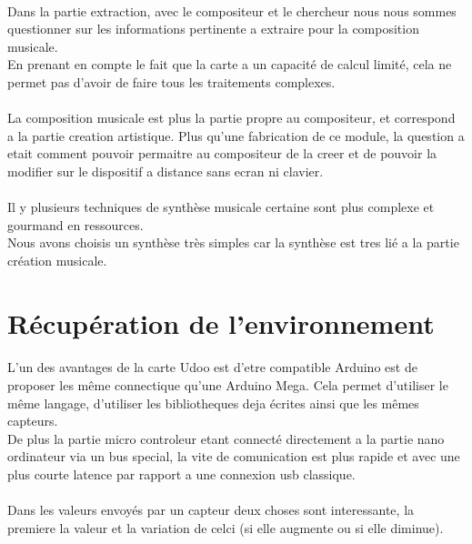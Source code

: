 \documentclass[a4paper, titlepage, oneside, 12pt]{article}%
\begin{document}
\paragraph{}
Dans la partie extraction, avec le compositeur et le chercheur nous nous sommes questionner sur les informations pertinente a extraire pour la composition musicale.\\ 
En prenant en compte le fait que la carte a un capacité de calcul limité, cela ne permet pas d'avoir de faire tous les traitements complexes.


\paragraph{}
La composition musicale est plus la partie propre au compositeur, et correspond a la partie creation artistique. Plus qu'une fabrication de ce module, la question a etait comment pouvoir permaitre au compositeur de la creer et de pouvoir la modifier sur le dispositif a distance sans ecran ni clavier.

\paragraph{}
Il y plusieurs techniques de synthèse musicale certaine sont plus complexe et gourmand en ressources.\\ Nous avons choisis un synthèse très simples car la synthèse est tres lié a la partie création musicale. 

\section{Récupération de l'environnement}
\paragraph{}
L'un des avantages de la carte Udoo est d'etre compatible Arduino est de proposer les même connectique qu'une Arduino Mega. Cela permet d'utiliser le même langage, d'utiliser les bibliotheques deja écrites ainsi que les mêmes capteurs.\\
De plus la partie  micro controleur etant connecté directement a la partie nano ordinateur via un bus special, la vite de comunication est plus rapide et avec une plus courte latence par rapport a une connexion usb classique.

\paragraph{}
Dans les valeurs envoyés par un capteur deux choses sont interessante, la premiere la valeur et la variation de celci (si elle augmente ou si elle diminue).
\end{document}
